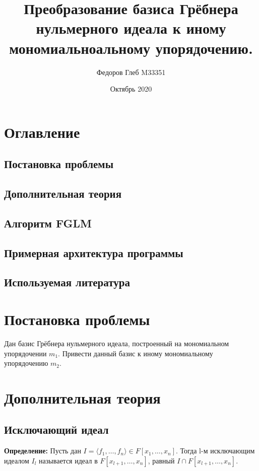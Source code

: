 \documentclass{article}
\title{Преобразование базиса Грёбнера нульмерного идеала к иному мономиальноальному упорядочению.}
\author{Федоров Глеб M33351}
\date{Октябрь 2020}
\begin{document}

    \begin{titlepage}
        \maketitle
    \end{titlepage}
    
\section{Оглавление}
    \subsection{Постановка проблемы}
    \subsection{Дополнительная теория}
    \subsection{Алгоритм FGLM}
    \subsection{Примерная архитектура программы}
    \subsection{Используемая литература}
    \newpage
\section{Постановка проблемы}
    Дан базис Грёбнера нульмерного идеала, построенный на мономиальном упорядочении $m_1$.
    Привести данный базис к иному мономиальному упорядочению $m_2$.
    \newpage
\section{Дополнительная теория} 
    \subsection{Исключающий идеал}

    \textbf{Определение:} Пусть дан $I = \langle f_1, \ldots, f_n \rangle  \in F[x_1,\ldots,x_n]$. Тогда l-м исключающим идеалом $I_l$ называется 
    идеал в $F[x_{l+1},\ldots, x_n]$, равный $I \cap F[x_{l+1},\ldots, x_n]$.
\end{document}
